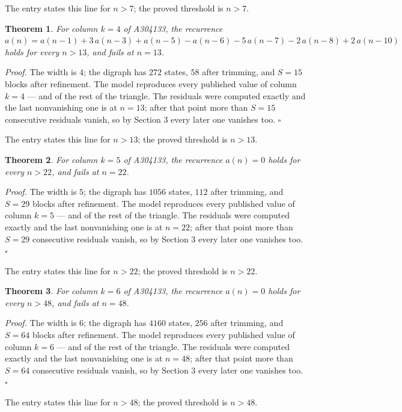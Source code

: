 \documentclass[11pt]{article}
\newtheorem{theorem}{Theorem}
\theoremstyle{definition}
\begin{document}
The entry states this line for $n > 7$; the proved threshold is $n > 7$.

\begin{theorem} For column $k = 4$ of A304133, the recurrence $a(n) = a(n-1) + 3\,a(n-3) + a(n-5) - a(n-6) - 5\,a(n-7) - 2\,a(n-8) + 2\,a(n-10)$ holds for every $n > 13$, and fails at $n = 13$.\end{theorem}

{\itshape Proof.} The width is $4$; the digraph has $272$ states, $58$ after trimming, and $S = 15$ blocks after refinement. The model reproduces every published value of column $k = 4$ --- and of the rest of the triangle. The residuals were computed exactly and the last nonvanishing one is at $n = 13$; after that point more than $S = 15$ consecutive residuals vanish, so by Section 3 every later one vanishes too. $\square$

The entry states this line for $n > 13$; the proved threshold is $n > 13$.

\begin{theorem} For column $k = 5$ of A304133, the recurrence $a(n) = 0$ holds for every $n > 22$, and fails at $n = 22$.\end{theorem}

{\itshape Proof.} The width is $5$; the digraph has $1056$ states, $112$ after trimming, and $S = 29$ blocks after refinement. The model reproduces every published value of column $k = 5$ --- and of the rest of the triangle. The residuals were computed exactly and the last nonvanishing one is at $n = 22$; after that point more than $S = 29$ consecutive residuals vanish, so by Section 3 every later one vanishes too. $\square$

The entry states this line for $n > 22$; the proved threshold is $n > 22$.

\begin{theorem} For column $k = 6$ of A304133, the recurrence $a(n) = 0$ holds for every $n > 48$, and fails at $n = 48$.\end{theorem}

{\itshape Proof.} The width is $6$; the digraph has $4160$ states, $256$ after trimming, and $S = 64$ blocks after refinement. The model reproduces every published value of column $k = 6$ --- and of the rest of the triangle. The residuals were computed exactly and the last nonvanishing one is at $n = 48$; after that point more than $S = 64$ consecutive residuals vanish, so by Section 3 every later one vanishes too. $\square$

The entry states this line for $n > 48$; the proved threshold is $n > 48$.
\end{document}
